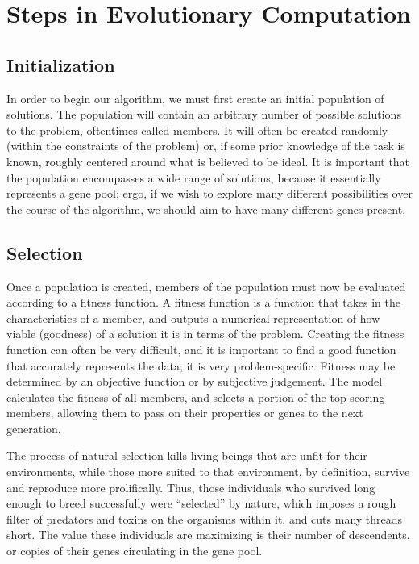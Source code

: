 \section{Steps in Evolutionary Computation}
\subsection{Initialization}
In order to begin our algorithm, we must first create an initial population of solutions. The population will contain an arbitrary number of possible solutions to the problem, oftentimes called members. It will often be created randomly (within the constraints of the problem) or, if some prior knowledge of the task is known, roughly centered around what is believed to be ideal. It is important that the population encompasses a wide range of solutions, because it essentially represents a gene pool; ergo, if we wish to explore many different possibilities over the course of the algorithm, we should aim to have many different genes present.

\subsection{Selection}
Once a population is created, members of the population must now be evaluated according to a fitness function. A fitness function is a function that takes in the characteristics of a member, and outputs a numerical representation of how viable (goodness) of a solution it is in terms of the problem. Creating the fitness function can often be very difficult, and it is important to find a good function that accurately represents the data; it is very problem-specific. Fitness may be determined by an objective function or by
subjective judgement. The model calculates the fitness of all members, and selects a portion of the top-scoring members, allowing them to pass on their properties or genes to the next generation.

The process of natural selection kills living beings that are unfit for their environments, while those more suited to that environment, by definition, survive and reproduce more prolifically. Thus, those individuals who survived long enough to breed successfully were “selected” by nature, which imposes a rough filter of predators and toxins on the organisms within it, and cuts many threads short. The value these individuals are maximizing is their number of descendents, or copies of their genes circulating in the gene pool.



